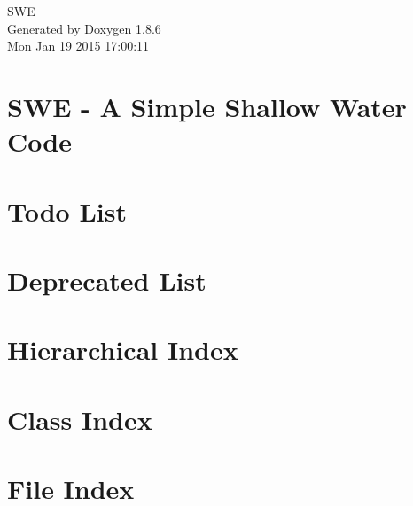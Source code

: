 \documentclass[twoside]{book}
\newcommand{\clearemptydoublepage}{%
  \newpage{\pagestyle{empty}\cleardoublepage}%
}
\begin{document}
\hypersetup{pageanchor=false}
\begin{titlepage}
\vspace*{7cm}
\begin{center}%
{\Large S\-W\-E }\\
\vspace*{1cm}
{\large Generated by Doxygen 1.8.6}\\
\vspace*{0.5cm}
{\small Mon Jan 19 2015 17:00:11}\\
\end{center}
\end{titlepage}
\clearemptydoublepage
\tableofcontents
\clearemptydoublepage
{}
\hypersetup{pageanchor=true}

\chapter{S\-W\-E -\/ A Simple Shallow Water Code}
\label{index}\hypertarget{index}{}
\chapter{Todo List}
\label{todo}
\hypertarget{todo}{}

\chapter{Deprecated List}
\label{deprecated}
\hypertarget{deprecated}{}

\chapter{Hierarchical Index}

\chapter{Class Index}

\chapter{File Index}

\end{document}
